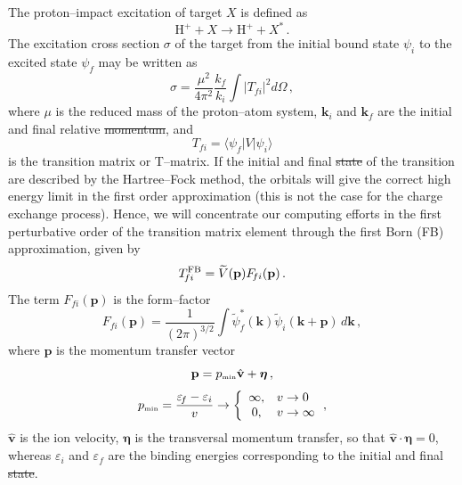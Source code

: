 \documentclass[10pt]{article}
\providecommand{\DIFaddtex}[1]{{\protect\color{blue}\uwave{#1}}} %
\providecommand{\DIFdeltex}[1]{{\protect\color{red}\sout{#1}}}                      %
\providecommand{\DIFaddbegin}{} %
\providecommand{\DIFaddend}{} %
\providecommand{\DIFdelbegin}{} %
\providecommand{\DIFdelend}{} %
\providecommand{\DIFadd}[1]{\texorpdfstring{\DIFaddtex{#1}}{#1}} %
\providecommand{\DIFdel}[1]{\texorpdfstring{\DIFdeltex{#1}}{}} %
\begin{document}
The proton--impact excitation of target $X$ is defined as 
\begin{equation}
 \mbox{H}^+ + X \rightarrow \mbox{H}^+ + X^*\,.
\end{equation}
The excitation cross section $\sigma$ of the target from the initial bound
state $\psi_i$ to the excited state $\psi_{\!f}$ may be written as 
\begin{equation}
 \sigma=\frac{\mu^2}{4\pi^2}\frac{k_{\!f}}{k_i}\int{\left|T_{\!fi}\right|^2 
 d\Omega}\,,
  \label{eq:cross-section}
\end{equation}
where $\mu$ is the reduced mass of the proton--atom system, 
$\mathbf{k}_i$ and $\mathbf{k}_{\!f}$ are the initial and final relative 
\DIFdelbegin \DIFdel{momentum}\DIFdelend \DIFaddbegin \DIFadd{momenta}\DIFaddend , and 
\begin{equation}
 T_{\!fi}=\langle \psi_{\!f}|V|\psi_i\rangle
 \label{eq:transition-matrix}
\end{equation}
is the transition matrix or T--matrix.
If the initial and final \DIFdelbegin \DIFdel{state }\DIFdelend \DIFaddbegin \DIFadd{states }\DIFaddend of the transition are described by
the Hartree--Fock method, the orbitals will give the correct high 
energy limit in the first order approximation (this is not the case 
for the charge exchange process). Hence, we will concentrate our 
computing efforts in the first perturbative order of the transition
matrix element through the first Born (FB) approximation, given by
\begin{equation}
 T_{\!fi}^{\mbox{\scriptsize FB}} = \widetilde{V}(\mathbf{p}) F_{\!fi}(\mathbf{p}) \,.
 \label{eq:firstbornTmatrix}
\end{equation}
The term $F_{\!fi}(\mathbf{p})$ is the form--factor
\begin{equation}
 F_{fi}(\mathbf{p}) = \frac{1}{(2\pi)^{3/2}} 
 \int{\widetilde{\psi}_{\!f}^*(\mathbf{k})
 \widetilde{\psi}_i(\mathbf{k}+\mathbf{p})\,d\mathbf{k}}\,,
 \label{eq:form-factor}
\end{equation}
where $\mathbf{p}$ is the momentum transfer vector
\begin{equation}
 \mathbf{p} = p_{\mbox{\tiny min}} \hat{\mathbf{v}} + \boldsymbol{\eta} \,,
\end{equation}
\begin{equation}
 p_{\mbox{\tiny min}} = \frac{\varepsilon_{\!f}-\varepsilon_i}{v} \rightarrow 
 \bigg\{
 \begin{array}{cl}
  \infty, &v\rightarrow 0 \\
  0, &v\rightarrow \infty
 \end{array}
 \,,
 \label{eq:pmin}
\end{equation}
$\hat{\mathbf{v}}$ is the ion velocity, $\boldsymbol{\eta}$ is
the transversal momentum transfer, so that 
$\hat{\mathbf{v}} \cdot \boldsymbol{\eta}=0$, whereas $\varepsilon_i$ 
and $\varepsilon_{\!f}$ are the binding energies corresponding to the 
initial and final \DIFdelbegin \DIFdel{state}\DIFdelend \DIFaddbegin \DIFadd{states}\DIFaddend .
\end{document}
